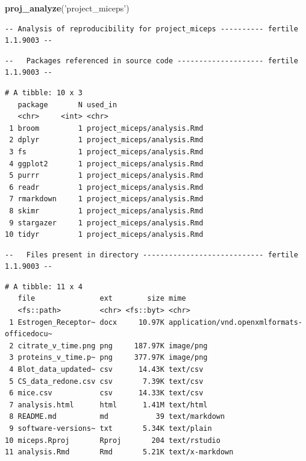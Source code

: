 \documentclass[12pt,twoside]{reedthesis}
\newenvironment{Shaded}{\begin{snugshade}}{\end{snugshade}}
\newcommand{\KeywordTok}[1]{\textcolor[rgb]{0.13,0.29,0.53}{\textbf{#1}}}
\newcommand{\NormalTok}[1]{#1}
\newcommand{\StringTok}[1]{\textcolor[rgb]{0.31,0.60,0.02}{#1}}
\begin{document}
\begin{Shaded}
\begin{Highlighting}[]
\KeywordTok{proj_analyze}\NormalTok{(}\StringTok{'project_miceps'}\NormalTok{)}
\end{Highlighting}
\end{Shaded}
\begin{verbatim}
-- Analysis of reproducibility for project_miceps ---------- fertile 1.1.9003 --
\end{verbatim}
\begin{verbatim}
--   Packages referenced in source code -------------------- fertile 1.1.9003 --
\end{verbatim}
\begin{verbatim}
# A tibble: 10 x 3
   package       N used_in                    
   <chr>     <int> <chr>                      
 1 broom         1 project_miceps/analysis.Rmd
 2 dplyr         1 project_miceps/analysis.Rmd
 3 fs            1 project_miceps/analysis.Rmd
 4 ggplot2       1 project_miceps/analysis.Rmd
 5 purrr         1 project_miceps/analysis.Rmd
 6 readr         1 project_miceps/analysis.Rmd
 7 rmarkdown     1 project_miceps/analysis.Rmd
 8 skimr         1 project_miceps/analysis.Rmd
 9 stargazer     1 project_miceps/analysis.Rmd
10 tidyr         1 project_miceps/analysis.Rmd
\end{verbatim}
\begin{verbatim}
--   Files present in directory ---------------------------- fertile 1.1.9003 --
\end{verbatim}
\begin{verbatim}
# A tibble: 11 x 4
   file               ext        size mime                                      
   <fs::path>         <chr> <fs::byt> <chr>                                     
 1 Estrogen_Receptor~ docx     10.97K application/vnd.openxmlformats-officedocu~
 2 citrate_v_time.png png     187.97K image/png                                 
 3 proteins_v_time.p~ png     377.97K image/png                                 
 4 Blot_data_updated~ csv      14.43K text/csv                                  
 5 CS_data_redone.csv csv       7.39K text/csv                                  
 6 mice.csv           csv      14.33K text/csv                                  
 7 analysis.html      html      1.41M text/html                                 
 8 README.md          md           39 text/markdown                             
 9 software-versions~ txt       5.34K text/plain                                
10 miceps.Rproj       Rproj       204 text/rstudio                              
11 analysis.Rmd       Rmd       5.21K text/x-markdown                           
\end{verbatim}
\end{document}
